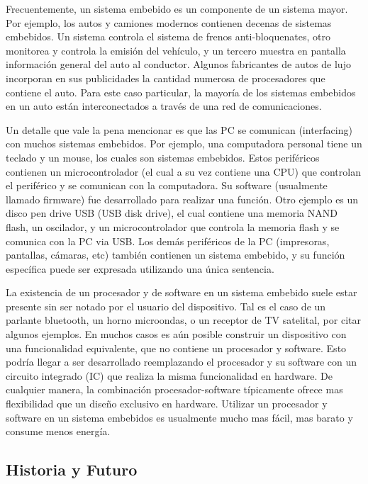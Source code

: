 \documentclass[output=paper, 
colorlinks,
citecolor=brown,
newtxmath
]{langscibook}
\begin{document}
Frecuentemente, un sistema embebido es un componente de un sistema mayor. Por ejemplo, 
los autos y camiones modernos contienen decenas de sistemas embebidos. Un sistema controla el sistema de frenos anti-bloquenates, otro monitorea y controla la emisión del vehículo, 
y un tercero muestra en pantalla información general del auto al conductor.  Algunos fabricantes de
autos de lujo incorporan en sus publicidades la cantidad numerosa de procesadores que contiene
el auto. Para este caso particular, la mayoría de los sistemas embebidos en un auto
están interconectados a través de una red de comunicaciones.



Un detalle que vale la pena mencionar es que las PC se comunican (interfacing) con 
muchos sistemas embebidos. Por ejemplo, una computadora personal tiene un teclado y un mouse,
los cuales son sistemas embebidos. Estos periféricos contienen un microcontrolador (el cual
a su vez contiene una CPU) que controlan el periférico y se comunican con la computadora.
Su software (usualmente llamado firmware) fue desarrollado para realizar una función.
Otro ejemplo es un disco pen drive USB (USB disk drive), el cual contiene una memoria NAND flash,
un oscilador, y un microcontrolador que controla la memoria flash y se comunica con la PC
via USB. Los demás periféricos de la PC (impresoras, pantallas, cámaras, etc) también
contienen un sistema embebido, y su función específica puede ser expresada utilizando
una única sentencia.

La existencia de un procesador y de software en un sistema embebido suele estar presente sin
ser notado por el usuario del dispositivo. Tal es el caso de un parlante bluetooth, un horno microondas,
o un receptor de TV satelital, por citar algunos ejemplos. En muchos casos es aún posible construir
un dispositivo con una funcionalidad equivalente, que no contiene un procesador y software. 
Esto podría llegar a ser desarrollado reemplazando el procesador y su software con un circuito integrado
(IC) que realiza la misma funcionalidad en hardware. De cualquier manera, la combinación
procesador-software típicamente ofrece mas flexibilidad que un diseño exclusivo en hardware. 
Utilizar un procesador y software en un sistema embebidos es usualmente mucho mas fácil, mas barato y 
consume menos energía.

\subsection {Historia y Futuro}
\end{document}
